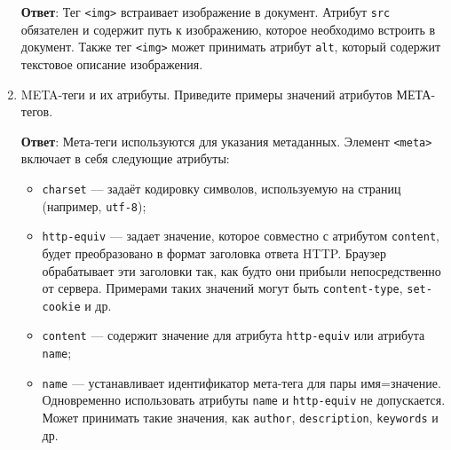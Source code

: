\documentclass[a4paper, 14pt]{extarticle}
\begin{document}
\begin{enumerate}[leftmargin=*]
  \textbf{Ответ}: Тег \texttt{<img>} встраивает изображение в документ.
  Атрибут \texttt{src} обязателен и содержит путь к изображению, которое
  необходимо встроить в документ. Также тег \texttt{<img>} может
  принимать атрибут \texttt{alt}, который содержит текстовое описание
  изображения.
  \item META-теги и их атрибуты. Приведите примеры значений атрибутов
  МЕТА-тегов.

  \textbf{Ответ}: Мета-теги используются для указания метаданных. Элемент
  \texttt{<meta>} включает в себя следующие атрибуты:
  \begin{itemize}
    \item \texttt{charset} --- задаёт кодировку символов, используемую на
    страниц (например, \texttt{utf-8});
    \item \texttt{http-equiv} --- задает значение, которое совместно с
    атрибутом \texttt{content}, будет преобразовано в формат
    заголовка ответа HTTP. Браузер обрабатывает эти заголовки так,
    как будто они прибыли непосредственно от сервера. Примерами
    таких значений могут быть \texttt{content-type},
    \texttt{set-cookie} и др.
    \item \texttt{content} --- содержит значение для атрибута
    \texttt{http-equiv} или атрибута \texttt{name};
    \item \texttt{name} --- устанавливает идентификатор мета-тега для
    пары имя=значение. Одновременно использовать атрибуты \texttt{name}
    и \texttt{http-equiv} не допускается. Может принимать такие
    значения, как \texttt{author}, \texttt{description},
    \texttt{keywords} и др.
  \end{itemize}
\end{enumerate}
\end{document}
